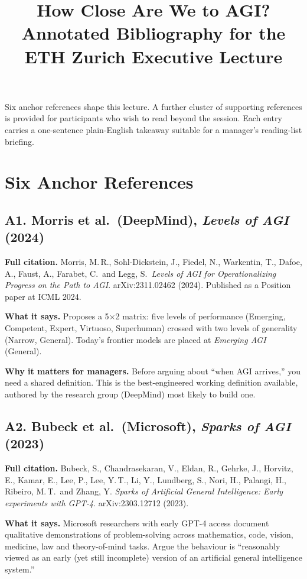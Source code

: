 \documentclass[11pt,a4paper]{article}
\title{How Close Are We to AGI? \\[0.2em]
       \large Annotated Bibliography for the ETH Zurich Executive Lecture}
\author{}
\date{}
\begin{document}
\maketitle
\thispagestyle{fancy}

\noindent
Six anchor references shape this lecture. A further cluster of supporting
references is provided for participants who wish to read beyond the session.
Each entry carries a one-sentence plain-English takeaway suitable for a
manager's reading-list briefing.

\section*{Six Anchor References}

\subsection*{A1. Morris et al.\ (DeepMind), \emph{Levels of AGI} (2024)}

\textbf{Full citation.}
Morris, M.\,R., Sohl-Dickstein, J., Fiedel, N., Warkentin, T., Dafoe, A.,
Faust, A., Farabet, C.\ and Legg, S.\
\emph{Levels of AGI for Operationalizing Progress on the Path to AGI}.
arXiv:2311.02462 (2024).
Published as a Position paper at ICML 2024.

\textbf{What it says.}
Proposes a 5$\times$2 matrix: five levels of performance (Emerging,
Competent, Expert, Virtuoso, Superhuman) crossed with two levels of
generality (Narrow, General). Today's frontier models are placed at
\emph{Emerging AGI} (General).

\textbf{Why it matters for managers.}
Before arguing about ``when AGI arrives,'' you need a shared definition.
This is the best-engineered working definition available, authored by
the research group (DeepMind) most likely to build one.

\subsection*{A2. Bubeck et al.\ (Microsoft), \emph{Sparks of AGI} (2023)}

\textbf{Full citation.}
Bubeck, S., Chandrasekaran, V., Eldan, R., Gehrke, J., Horvitz, E.,
Kamar, E., Lee, P., Lee, Y.\,T., Li, Y., Lundberg, S., Nori, H., Palangi,
H., Ribeiro, M.\,T.\ and Zhang, Y.
\emph{Sparks of Artificial General Intelligence: Early experiments
with GPT-4}. arXiv:2303.12712 (2023).

\textbf{What it says.}
Microsoft researchers with early GPT-4 access document qualitative
demonstrations of problem-solving across mathematics, code, vision,
medicine, law and theory-of-mind tasks. Argue the behaviour is
``reasonably viewed as an early (yet still incomplete) version of
an artificial general intelligence system.''
\end{document}
